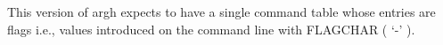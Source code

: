 This version of argh expects to have a single command table whose
entries are flags i.e., values introduced on the command line with
FLAGCHAR ( `-' ). \\



%
